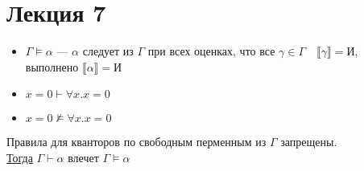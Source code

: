 \documentclass[oneside]{book}
\renewcommand{\leftmark}{}
\begin{document}
\chapter*{Лекция 7}\renewcommand{\leftmark}{Лекция 7}
\label{sec:orgf17ce71}
\begin{itemize}
	\item \(\Gamma \vDash \alpha\) --- \(\alpha\) следует из \(\Gamma\) при всех оценках, что все \(\gamma \in \Gamma\quad \llbracket \gamma \rrbracket = \text{И}\), выполнено \(\llbracket \alpha \rrbracket = \text{И}\)
	\item \(x = 0 \vdash \forall x. x = 0\)
	\item \(x = 0 \not\vDash \forall x. x = 0\)
\end{itemize}
\begin{definition}
	Правила для кванторов по свободным перменным из \(\Gamma\) запрещены. \\
	\uline{Тогда} \(\Gamma \vdash \alpha\) влечет \(\Gamma \vDash \alpha\)
	\label{orgceb81ee}
\end{definition}
\end{document}
